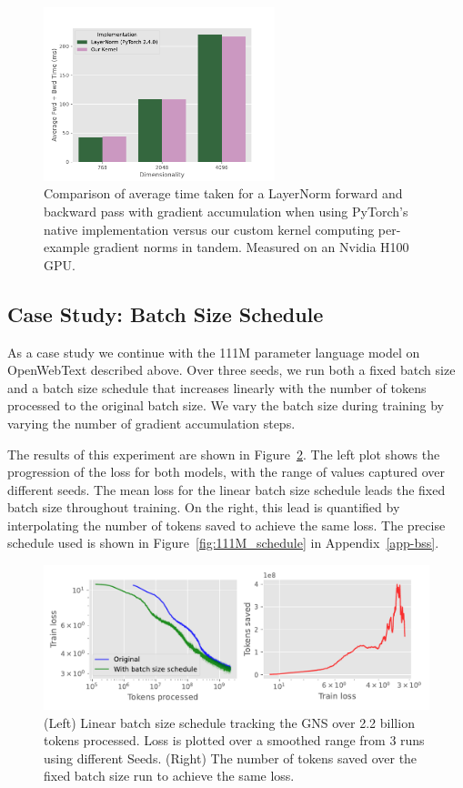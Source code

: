 \documentclass{article}
\begin{document}
\begin{figure}
    \centering
    \includegraphics[width=0.6\textwidth]{figures/ln-vs-kernel-time.pdf}
    \caption{%
    Comparison of average time taken for a LayerNorm forward and backward pass
    with gradient accumulation when using PyTorch's native implementation versus
    our custom kernel computing per-example gradient norms in tandem. Measured
    on an Nvidia H100 GPU.}
    \label{fig:pt-vs-kernel}
\end{figure}

\subsection{Case Study: Batch Size Schedule}\label{bss}

As a case study we continue with the 111M parameter language model on
OpenWebText described above. Over three seeds, we run both a fixed batch size
and a batch size schedule that increases linearly with the number of tokens
processed to the original batch size. We vary the batch size during training by
varying the number of gradient accumulation steps.

The results of this experiment are shown in Figure~\ref{fig:111M_bss}. The left
plot shows the progression of the loss for both models, with the range of values
captured over different seeds. The mean loss for the linear batch size schedule
leads the fixed batch size throughout training. On the right, this lead is
quantified by interpolating the number of tokens saved to achieve the same loss.
The precise schedule used is shown in Figure~\ref{fig:111M_schedule} in
Appendix~\ref{app-bss}.

\begin{figure}
    \centering
    \includegraphics[width=\textwidth]{figures/bs_sched.pdf}
    \caption{%
        (Left) Linear batch size schedule tracking the GNS over 2.2 billion
        tokens processed. Loss is plotted over a smoothed range from 3 runs
        using different Seeds. (Right) The number of tokens saved over the fixed
        batch size run to achieve the same loss.}
    \label{fig:111M_bss}
\end{figure}
\end{document}
